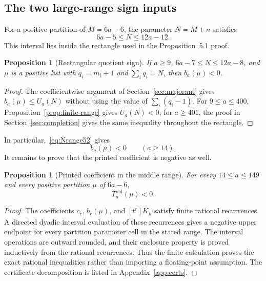\documentclass[11pt]{article}
\newtheorem{proposition}[theorem]{Proposition}
\theoremstyle{definition}
\theoremstyle{remark}
\begin{document}
\subsection{The two large-range sign inputs}\label{subsec:large52}

For a positive partition of $M=6a-6$, the parameter $N=M+n$ satisfies
\begin{equation}\label{eq:Nrange52}
  6a-5\le N\le12a-12.
\end{equation}
This interval lies inside the rectangle used in the Proposition~5.1 proof.

\begin{proposition}[Rectangular quotient sign]\label{prop:rectangle-bneg}
If $a\ge9$, $6a-7\le N\le12a-8$, and $\mu$ is a positive list with
$q_i=m_i+1$ and $\sum_iq_i=N$, then $b_a(\mu)<0$.
\end{proposition}

\begin{proof}
The coefficientwise argument of Section~\ref{sec:majorant} gives
$b_a(\mu)\le U_a(N)$ without using the value of $\sum_i(q_i-1)$.  For
$9\le a\le400$, Proposition~\ref{prop:finite-range} gives $U_a(N)<0$; for
$a\ge401$, the proof in Section~\ref{sec:completion} gives the same inequality
throughout the rectangle.
\end{proof}

In particular,~\eqref{eq:Nrange52} gives
\begin{equation}\label{eq:bneg52}
  b_a(\mu)<0\qquad(a\ge14).
\end{equation}
It remains to prove that the printed coefficient is negative as well.

\begin{proposition}[Printed coefficient in the middle range]
\label{prop:printed-mid}
For every $14\le a\le149$ and every positive partition $\mu$ of $6a-6$,
\[
  T_a^{\mathrm{old}}(\mu)<0.
\]
\end{proposition}

\begin{proof}
The coefficients $c_r$, $b_r(\mu)$, and $[t^r]K_\mu$ satisfy finite rational
recurrences.  A directed dyadic interval evaluation of these recurrences gives
a negative upper endpoint for every partition parameter cell in the stated
range.  The interval operations are outward rounded, and their enclosure
property is proved inductively from the rational recurrences.  Thus the finite
calculation proves the exact rational inequalities rather than importing a
floating-point assumption.  The certificate decomposition is listed in
Appendix~\ref{app:certs}.
\end{proof}
\end{document}
